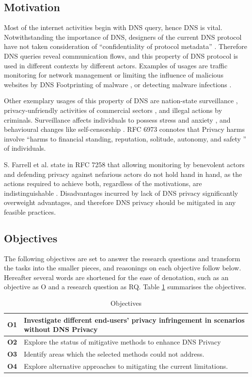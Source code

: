 \documentclass[a4paper,12pt]{article}
\begin{document}
\subsection{Motivation}
Most of the internet activities begin with DNS query, hence DNS is vital. Notwithstanding the importance of DNS, designers of the current DNS protocol have not taken consideration of ``confidentiality of protocol metadata'' \cite{wachs2014censorship}.
Therefore DNS queries reveal communication flows, and this property of DNS protocol is used in different contexts by different actors. Examples of usages are traffic monitoring for network management or limiting the influence of malicious websites by DNS Footprinting of malware \cite{stoner2010dns}, or detecting malware infections \cite{lemos2013got}.

Other exemplary usages of this property of DNS are nation-state surveillance \cite{NSA-SIGINT}, privacy-unfriendly activities of commercial sectors \cite{weaver2011redirecting}, and illegal actions by criminals. Surveillance affects individuals to possess stress and anxiety \cite{oulasvirta2012long}, and behavioural changes like self-censorship \cite{rfc6973}. RFC 6973 connotes that Privacy harms involve ``harms to financial standing, reputation, solitude, autonomy, and safety \cite{rfc6973}'' of individuals.

S. Farrell et al. state in RFC 7258 that allowing monitoring by benevolent actors and defending privacy against nefarious actors do not hold hand in hand, as the actions required to achieve both, regardless of the motivations, are indistinguishable \cite{rfc7258}.
Disadvantages incurred by lack of DNS privacy significantly overweight advantages, and therefore DNS privacy should be mitigated in any feasible practices.

\subsection{Objectives}
The following objectives are set to answer the research questions and transform the tasks into the smaller pieces, and reasonings on each objective follow below. Hereafter several words are shortened for the ease of denotation, such as an objective as O and a research question as RQ. Table \ref{objectives} summarises the objectives.
\begin{table}[h!]
    \begin{tabular} {|p{1.2cm}|p{12.8cm}|} \hline
        \textbf{O1} & Investigate different end-users' privacy infringement in scenarios without DNS Privacy\\ \hline
        \textbf{O2} & Explore the status of mitigative methods to enhance DNS Privacy \\ \hline
        \textbf{O3} & Identify areas which the selected methods could not address. \\ \hline
        \textbf{O4} & Explore alternative approaches to mitigating the current limitations.\\ \hline
    \end{tabular}
    \caption{Objectives}
    \label{objectives}
\end{table}
\end{document}
